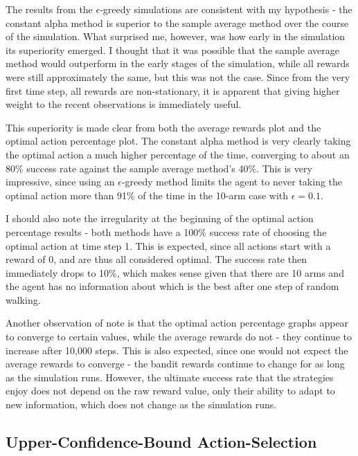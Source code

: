 \documentclass{article}
\begin{document}
The results from the $\epsilon$-greedy simulations are consistent with my hypothesis - the constant alpha method is superior to the sample average method over the course of the simulation. What surprised me, however, was how early in the simulation its superiority emerged. I thought that it was possible that the sample average method would outperform in the early stages of the simulation, while all rewards were still approximately the same, but this was not the case. Since from the very first time step, all rewards are non-stationary, it is apparent that giving higher weight to the recent observations is immediately useful. 

This superiority is made clear from both the average rewards plot and the optimal action percentage plot. The constant alpha method is very clearly taking the optimal action a much higher percentage of the time, converging to about an 80\% success rate against the sample average method's 40\%. This is very impressive, since using an $\epsilon$-greedy method limits the agent to never taking the optimal action more than 91\% of the time in the 10-arm case with $\epsilon=0.1$.

I should also note the irregularity at the beginning of the optimal action percentage results - both methods have a 100\% success rate of choosing the optimal action at time step 1. This is expected, since all actions start with a reward of 0, and are thus all considered optimal. The success rate then immediately drops to 10\%, which makes sense given that there are 10 arms and the agent has no information about which is the best after one step of random walking.

Another observation of note is that the optimal action percentage graphs appear to converge to certain values, while the average rewards do not - they continue to increase after 10,000 steps. This is also expected, since one would not expect the average rewards to converge - the bandit rewards continue to change for as long as the simulation runs. However, the ultimate success rate that the strategies enjoy does not depend on the raw reward value, only their ability to adapt to new information, which does not change as the simulation runs.

\subsection{Upper-Confidence-Bound Action-Selection}
\maketitle
\end{document}
